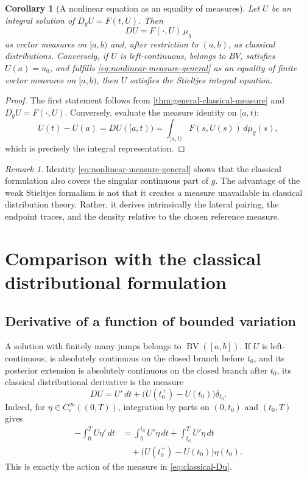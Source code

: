 \documentclass[preprint,12pt]{elsarticle}
\newcommand{\newrev}[1]{{\color{red}#1}}
\newcommand{\finalrev}[1]{{\color{red}#1}}
\newcommand{\newrev}[1]{#1}
\newcommand{\finalrev}[1]{#1}
\newtheorem{corollary}[theorem]{Corollary}
\theoremstyle{definition}
\theoremstyle{remark}
\newtheorem{remark}[theorem]{Remark}
\newcommand{\BV}{\operatorname{BV}}
\begin{document}
\begin{corollary}[A nonlinear equation as an equality of measures]\label{cor:nonlinear-measure}
Let $U$ be an integral solution of $D_gU=F(t,U)$. Then
\begin{equation}\label{eq:nonlinear-measure-general}
 DU=F(\cdot,U)\,\mu_g
\end{equation}
as vector measures \newrev{on $[a,b)$ and, after restriction to $(a,b)$, as classical distributions}. Conversely, if $U$ is left-continuous, belongs to $BV$, satisfies $U(a)=u_0$, and \finalrev{fulfills \eqref{eq:nonlinear-measure-general} as an equality of finite vector measures on $[a,b)$}, then $U$ satisfies the Stieltjes integral equation.
\end{corollary}

\begin{proof}
The first statement follows from \cref{thm:general-classical-measure} and $D_gU=F(\cdot,U)$. Conversely, evaluate the measure identity on $[a,t)$:
\[
 U(t)-U(a)=DU([a,t))=\int_{[a,t)}F(s,U(s))\,d\mu_g(s),
\]
which is precisely the integral representation.
\end{proof}

\begin{remark}
Identity \eqref{eq:nonlinear-measure-general} shows that the classical formulation also covers the singular continuous part of $g$. The advantage of the weak Stieltjes formalism is not that it creates a measure unavailable in classical distribution theory. Rather, it derives intrinsically the lateral pairing, the endpoint traces, and the density relative to the chosen reference measure.
\end{remark}

\section{Comparison with the classical distributional formulation}\label{sec:classical}

\subsection{Derivative of a function of bounded variation}

A solution with finitely many jumps belongs to $\BV([a,b])$. \finalrev{If \(U\) is left-continuous, is absolutely continuous on the closed branch before \(t_0\), and its posterior extension is absolutely continuous on the closed branch after \(t_0\),} its classical distributional derivative is the measure
\begin{equation}\label{eq:classical-Du}
 DU=U'\,dt+\bigl(U(t_0^+)-U(t_0)\bigr)\delta_{t_0}.
\end{equation}
Indeed, for $\eta\in C_c^\infty((0,T))$, integration by parts on $(0,t_0)$ and $(t_0,T)$ gives
\begin{align*}
 -\int_0^T U\eta'\,dt
 &=\int_0^{t_0}U'\eta\,dt+\int_{t_0}^TU'\eta\,dt\\
 &\quad+\bigl(U(t_0^+)-U(t_0)\bigr)\eta(t_0).
\end{align*}
This is exactly the action of the measure in \eqref{eq:classical-Du}.
\end{document}
